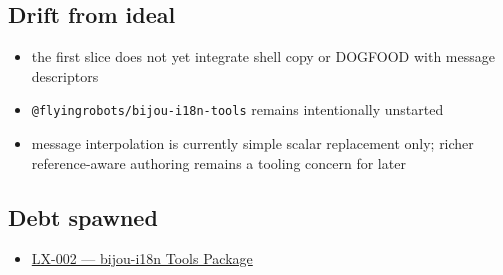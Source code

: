 \subsection{Drift from ideal}\label{record-188-drift-from-ideal}

\begin{itemize}
\tightlist
\item
  the first slice does not yet integrate shell copy or DOGFOOD with message descriptors
\item
  \texttt{@\allowbreak{}f\allowbreak{}l\allowbreak{}y\allowbreak{}i\allowbreak{}n\allowbreak{}g\allowbreak{}r\allowbreak{}o\allowbreak{}b\allowbreak{}o\allowbreak{}t\allowbreak{}s\allowbreak{}/\allowbreak{}b\allowbreak{}i\allowbreak{}j\allowbreak{}o\allowbreak{}u\allowbreak{}-\allowbreak{}i\allowbreak{}1\allowbreak{}8\allowbreak{}n\allowbreak{}-\allowbreak{}t\allowbreak{}o\allowbreak{}o\allowbreak{}l\allowbreak{}s} remains intentionally unstarted
\item
  message interpolation is currently simple scalar replacement only; richer reference-aware authoring remains a tooling concern for later
\end{itemize}

\subsection{Debt spawned}\label{record-188-debt-spawned}

\begin{itemize}
\tightlist
\item
  \href{https://github.com/flyingrobots/bijou/blob/cbd70612140e7a450d764b3c7be1c6af878b99bc/docs/method/graveyard/legacy-backlog/LX-002-bijou-i18n-tools-package.md}{LX-002 --- bijou-i18n Tools Package}
\end{itemize}

